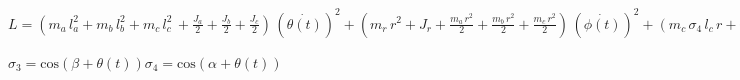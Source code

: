 \begin{center}
	$L = {\left(m_a \,l_a^2 +m_b \,l_b^2 +m_c \,l_c^2 \, +\frac{J_a}{2}+\frac{J_b}{2}+\frac{J_c}{2}\right)}\,({\dot{\theta \left(t\right)}})^2 +
	{\left(m_r \,r^2 +J_r +\frac{m_a \,r^2}{2}+\frac{m_b \,r^2}{2}+\frac{m_c \,r^2}{2}\right)}\,({\dot{\phi \left(t\right)}})^2 +
	{\left(m_c \,\sigma_4 \,l_c \,r +m_a \,\sigma_3 \,l_a \,r -m_b \, cos\left(\theta \left(t\right)\right)\,l_b \,r\right)}\dot{\theta \left(t\right)}\,\dot{\phi \left(t\right)}+
	g\,m_b \,\mathrm{cos}\left(\theta \left(t\right)\right)\,l_b -g\,m_c \,\sigma_4 \,l_c -g\,m_a \,\sigma_3 \,l_a$
	
	$\sigma_3 =\mathrm{cos}\left(\beta +\theta \left(t\right)\right)
	\sigma_4 =\mathrm{cos}\left(\alpha +\theta \left(t\right)\right)$
\end{center}


